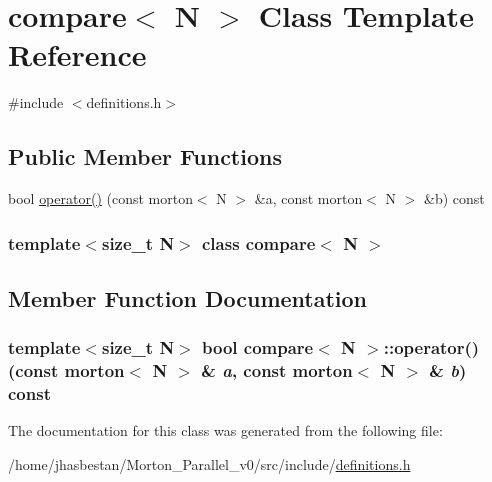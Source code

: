 \hypertarget{classcompare}{
\section{compare$<$ N $>$ Class Template Reference}
\label{classcompare}
}


{\ttfamily \#include $<$definitions.h$>$}\subsection*{Public Member Functions}
\begin{DoxyCompactItemize}
\item 
bool \hyperlink{classcompare_ab5e43ce07c394abfae0f5de0b49492ba}{operator()} (const morton$<$ N $>$ \&a, const morton$<$ N $>$ \&b) const 
\end{DoxyCompactItemize}
\subsubsection*{template$<$size\_\-t N$>$ class compare$<$ N $>$}



\subsection{Member Function Documentation}
\hypertarget{classcompare_ab5e43ce07c394abfae0f5de0b49492ba}{
\subsubsection[{operator()}]{\setlength{\rightskip}{0pt plus 5cm}template$<$size\_\-t N$>$ bool {\bf compare}$<$ N $>$::operator() (const morton$<$ N $>$ \& {\em a}, \/  const morton$<$ N $>$ \& {\em b}) const}}
\label{classcompare_ab5e43ce07c394abfae0f5de0b49492ba}


The documentation for this class was generated from the following file:\begin{DoxyCompactItemize}
\item 
/home/jhasbestan/Morton\_\-Parallel\_\-v0/src/include/\hyperlink{definitions_8h}{definitions.h}\end{DoxyCompactItemize}
